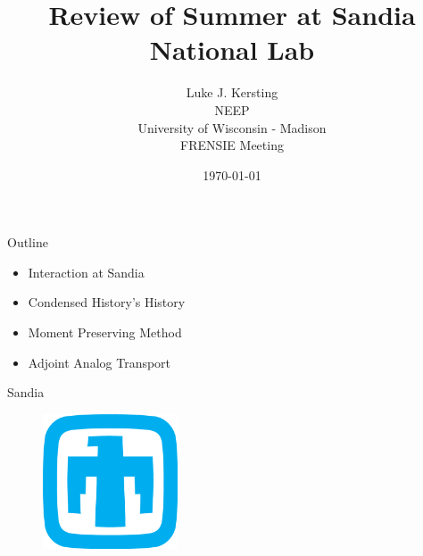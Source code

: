 \documentclass{beamer}
\author{Luke J. Kersting
    \\ NEEP
    \\ University of Wisconsin - Madison
    \\ FRENSIE Meeting
}
\date{\today}
\title{Review of Summer at Sandia National Lab}
\begin{document}
\maketitle

\begin{frame}{Outline}

  \begin{itemize}
    \item Interaction at Sandia
    \item Condensed History's History
    \item Moment Preserving Method
    \item Adjoint Analog Transport
  \end{itemize}

\end{frame}

\begin{frame}{Sandia}

    \begin{figure}
     \includegraphics[width=40mm]{twitter_logo.png}
   \end{figure}

\end{frame}
\end{document}
